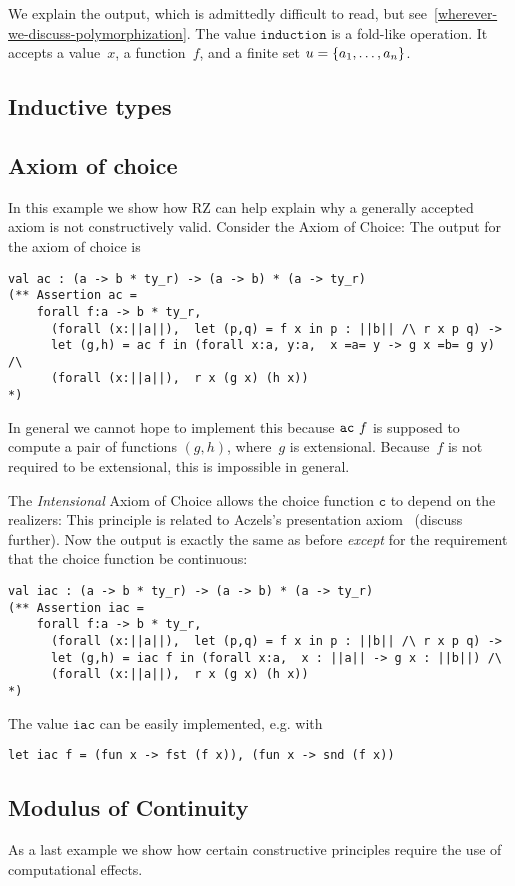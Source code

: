 %
We explain the output, which is admittedly difficult to read, but
see~\ref{wherever-we-discuss-polymorphization}. The value
$\mathtt{induction}$ is a fold-like operation. It accepts a value~$x$,
a function~$f$, and a finite set $u = \{a_1, \ldots, a_n\}$.



\subsection{Inductive types}
\label{sec:inductive-types}



\subsection{Axiom of choice}
\label{sec:axiom-choice}

In this example we show how RZ can help explain why a generally
accepted axiom is not constructively valid. Consider the Axiom of
Choice:
%
%
The output for the axiom of choice is
%
\begin{verbatim}
val ac : (a -> b * ty_r) -> (a -> b) * (a -> ty_r)
(** Assertion ac =
    forall f:a -> b * ty_r,
      (forall (x:||a||),  let (p,q) = f x in p : ||b|| /\ r x p q) ->
      let (g,h) = ac f in (forall x:a, y:a,  x =a= y -> g x =b= g y) /\
      (forall (x:||a||),  r x (g x) (h x))
*)
\end{verbatim}
%
In general we cannot hope to implement this because
$\mathtt{ac}\ f$ is supposed to compute a pair of functions
$(g,h)$, where~$g$ is extensional. Because~$f$ is not required to be
extensional, this is impossible in general.

The \emph{Intensional} Axiom of Choice allows the choice function
$\mathtt{c}$ to depend on the realizers:
%
%
This principle is related to Aczels's presentation
axiom~\cite{aczel:presentation} (discuss further). Now the output is
exactly the same as before \emph{except} for the requirement that the
choice function be continuous:
%
\begin{verbatim}
val iac : (a -> b * ty_r) -> (a -> b) * (a -> ty_r)
(** Assertion iac =
    forall f:a -> b * ty_r,
      (forall (x:||a||),  let (p,q) = f x in p : ||b|| /\ r x p q) ->
      let (g,h) = iac f in (forall x:a,  x : ||a|| -> g x : ||b||) /\
      (forall (x:||a||),  r x (g x) (h x))
*)
\end{verbatim}
%
The value $\mathtt{iac}$ can be easily implemented, e.g. with
%
\begin{verbatim}
let iac f = (fun x -> fst (f x)), (fun x -> snd (f x))
\end{verbatim}

\subsection{Modulus of Continuity}
\label{sec:we-show-modulus-of-continuity-example}

As a last example we show how certain constructive principles require
the use of computational effects. 



